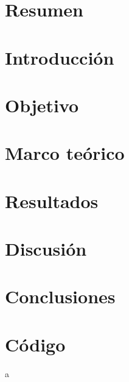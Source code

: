 \documentclass[12pt,letterpaper]{article}
\begin{document}

\section{Resumen}

\section{Introducción}

\section{Objetivo}

\section{Marco teórico}

\section{Resultados}

\section{Discusión}

\section{Conclusiones}

\section{Código}

a

\nocite{*}

\end{document}
